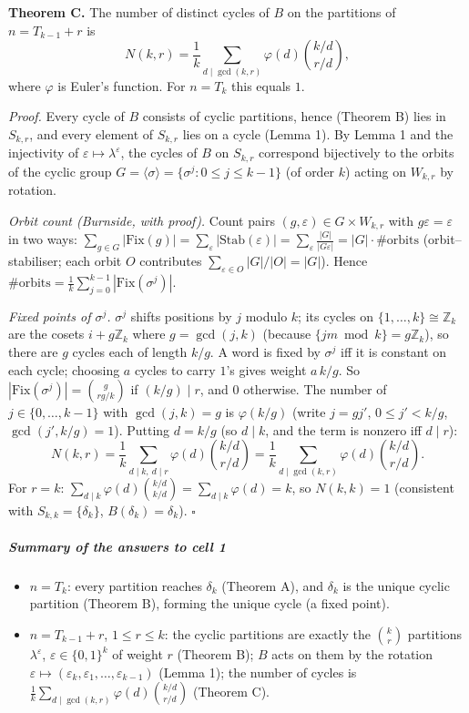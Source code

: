 \textbf{Theorem C.} The number of distinct cycles of \(B\) on the
partitions of \(n=T_{k-1}+r\) is
\[N(k,r)=\frac1k\sum_{d\mid\gcd(k,r)}\varphi(d)\binom{k/d}{r/d},\] where
\(\varphi\) is Euler's function. For \(n=T_k\) this equals \(1\).

\emph{Proof.} Every cycle of \(B\) consists of cyclic partitions, hence
(Theorem B) lies in \(S_{k,r}\), and every element of \(S_{k,r}\) lies
on a cycle (Lemma 1). By Lemma 1 and the injectivity of
\(\varepsilon\mapsto\lambda^\varepsilon\), the cycles of \(B\) on
\(S_{k,r}\) correspond bijectively to the orbits of the cyclic group
\(G=\langle\sigma\rangle=\{\sigma^j:0\le j\le k-1\}\) (of order \(k\))
acting on \(W_{k,r}\) by rotation.

\emph{Orbit count (Burnside, with proof).} Count pairs
\((g,\varepsilon)\in G\times W_{k,r}\) with \(g\varepsilon=\varepsilon\)
in two ways:
\(\sum_{g\in G}|\mathrm{Fix}(g)|=\sum_{\varepsilon}|\mathrm{Stab}(\varepsilon)|=\sum_{\varepsilon}\frac{|G|}{|G\varepsilon|}=|G|\cdot\#\text{orbits}\)
(orbit--stabiliser; each orbit \(O\) contributes
\(\sum_{\varepsilon\in O}|G|/|O|=|G|\)). Hence
\(\#\text{orbits}=\frac1k\sum_{j=0}^{k-1}|\mathrm{Fix}(\sigma^j)|\).

\emph{Fixed points of \(\sigma^j\).} \(\sigma^j\) shifts positions by
\(j\) modulo \(k\); its cycles on \(\{1,\dots,k\}\cong\mathbb Z_k\) are
the cosets \(i+g\mathbb Z_k\) where \(g=\gcd(j,k)\) (because
\(\{jm\bmod k\}=g\mathbb Z_k\)), so there are \(g\) cycles each of
length \(k/g\). A word is fixed by \(\sigma^j\) iff it is constant on
each cycle; choosing \(a\) cycles to carry \(1\)'s gives weight
\(a\,k/g\). So \(|\mathrm{Fix}(\sigma^j)|=\binom{g}{rg/k}\) if
\((k/g)\mid r\), and \(0\) otherwise. The number of
\(j\in\{0,\dots,k-1\}\) with \(\gcd(j,k)=g\) is \(\varphi(k/g)\) (write
\(j=gj'\), \(0\le j'<k/g\), \(\gcd(j',k/g)=1\)). Putting \(d=k/g\) (so
\(d\mid k\), and the term is nonzero iff \(d\mid r\)):
\[N(k,r)=\frac1k\sum_{d\mid k,\ d\mid r}\varphi(d)\binom{k/d}{r/d}=\frac1k\sum_{d\mid\gcd(k,r)}\varphi(d)\binom{k/d}{r/d}.\]
For \(r=k\):
\(\sum_{d\mid k}\varphi(d)\binom{k/d}{k/d}=\sum_{d\mid k}\varphi(d)=k\),
so \(N(k,k)=1\) (consistent with \(S_{k,k}=\{\delta_k\}\),
\(B(\delta_k)=\delta_k\)). \(\square\)

\subparagraph{Summary of the answers to cell
1}\label{summary-of-the-answers-to-cell-1}

\begin{itemize}
\tightlist
\item
  \(n=T_k\): every partition reaches \(\delta_k\) (Theorem A), and
  \(\delta_k\) is the unique cyclic partition (Theorem B), forming the
  unique cycle (a fixed point).
\item
  \(n=T_{k-1}+r\), \(1\le r\le k\): the cyclic partitions are exactly
  the \(\binom kr\) partitions \(\lambda^\varepsilon\),
  \(\varepsilon\in\{0,1\}^k\) of weight \(r\) (Theorem B); \(B\) acts on
  them by the rotation
  \(\varepsilon\mapsto(\varepsilon_k,\varepsilon_1,\dots,\varepsilon_{k-1})\)
  (Lemma 1); the number of cycles is
  \(\frac1k\sum_{d\mid\gcd(k,r)}\varphi(d)\binom{k/d}{r/d}\) (Theorem
  C).
\end{itemize}

